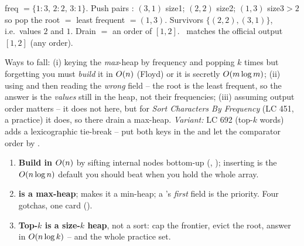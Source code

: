 \begin{tracebox}[Official sample: \texttt{nums=[1,1,1,2,2,3]}, \texttt{k=2}]
freq $= \{1{:}3,\, 2{:}2,\, 3{:}1\}$. Push pairs : $(3,1)$ size1; $(2,2)$ size2;
$(1,3)$ size3$>2$ so pop the root $=$ least frequent $=(1,3)$. Survivors $\{(2,2),(3,1)\}$, i.e.\ values
$2$ and $1$. Drain $=$ an order of $[1,2]$. \checkmark\ matches the official output $[1,2]$ (any order).
\end{tracebox}


\begin{warningbox}
Ways to fall: (i) keying the \emph{max}-heap by frequency and popping $k$ times but forgetting you must
\emph{build} it in $O(n)$ (Floyd) or it is secretly $O(m\log m)$; (ii) using  and
then reading the \emph{wrong} field -- the root is the least frequent, so the answer is the \emph{values}
still in the heap, not their frequencies; (iii) assuming output order matters -- it does not here, but for
\emph{Sort Characters By Frequency} (LC 451, a practice) it does, so there drain a max-heap.
\emph{Variant:} LC 692 (top-$k$ words) adds a lexicographic tie-break -- put both keys in the 
and let the comparator order by .
\end{warningbox}

\begin{insightbox}
\begin{enumerate}[nosep, leftmargin=1.6em]
  \item \textbf{Build in $O(n)$} by sifting internal nodes bottom-up (,
        ); inserting is the $O(n\log n)$ default you should beat when you hold the
        whole array.
  \item \textbf{ is a max-heap};  makes it a min-heap; a 's
        \emph{first} field is the priority. Four gotchas, one card ().
  \item \textbf{Top-$k$ is a size-$k$ heap}, not a sort: cap the frontier, evict the root, answer in
        $O(n\log k)$ --  and the whole practice set.
\end{enumerate}
\end{insightbox}

